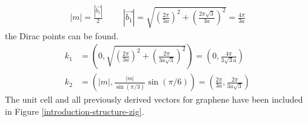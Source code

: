 			\begin{align}
				|m|=\frac{|\vec{b_{1}}|}{2}\hspace{1cm}|\vec{b_{1}}|=\sqrt{\left(\frac{2\pi}{3a}\right)^{2}+\left(\frac{2\pi\sqrt{3}}{3a}\right)^{2}}=\frac{4\pi}{3a}
			\end{align}
			the Dirac points can be found.
			\begin{align}
				k_{1}&=\left(0,\sqrt{\left(\frac{2\pi}{3a}\right)^{2}+\left(\frac{2\pi}{3a\sqrt{3}}\right)^{2}}\right)=\left(0,\frac{4\pi}{3\sqrt{3}a}\right)\\
				k_{2}&=\left(|m|,\frac{|m|}{\sin(\pi/3)}\sin(\pi/6)\right)=\left(\frac{2\pi}{3a},\frac{2\pi}{3a\sqrt{3}}\right)
			\end{align}
			The unit cell and all previously derived vectors for graphene have been included in Figure \ref{introduction-structure-zig}.
